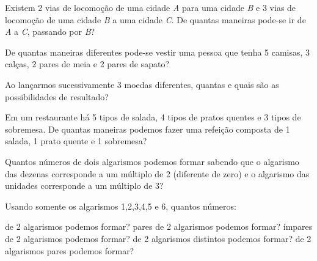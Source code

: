 \documentclass[10pt,a4paper]{article}
\begin{document}



	\begin{multicols}{2}

	  \setlength\columnseprule{0.6pt} %

    \begin{question}[type=exam]
        Existem 2 vias de locomoção de uma cidade \textit{A} para uma cidade
        \textit{B} e 3 vias de locomoção de uma cidade \textit{B} a uma
        cidade \textit{C}. De quantas maneiras pode-se ir de \textit{A} a
        \textit{C}, passando por \textit{B}?
    \end{question}

    \begin{question}[type=exam]
        De quantas maneiras diferentes pode-se vestir uma pessoa que tenha
        5 camisas, 3 calças, 2 pares de meia e 2 pares de sapato?
    \end{question}

    \begin{question}[type=exam]
        Ao lançarmos sucessivamente 3 moedas diferentes, quantas e quais
        são as possibilidades de resultado?
    \end{question}

    \begin{question}[type=exam]
        Em um restaurante há 5 tipos de salada, 4 tipos de pratos quentes e
        3 tipos de sobremesa. De quantas maneiras podemos fazer uma refeição
        composta de 1 salada, 1 prato quente e 1 sobremesa?
    \end{question}

    \begin{question}[type=exam]
        Quantos números de dois algarismos podemos formar sabendo que o
        algarismo das dezenas corresponde a um múltiplo de 2 (diferente de zero)
        e o algarismo das unidades corresponde a um múltiplo de 3?
    \end{question}

    \begin{question}[type=exam]
        Usando somente os algarismos 1,2,3,4,5 e 6, quantos números:
        \begin{tasks}
            \task de 2 algarismos podemos formar?
            \task pares de 2 algarismos podemos formar?
            \task ímpares de 2 algarismos podemos formar?
            \task de 2 algarismos distintos podemos formar?
            \task de 2 algarismos pares podemos formar?
        \end{tasks}
    \end{question}


\end{multicols}
\end{document}
